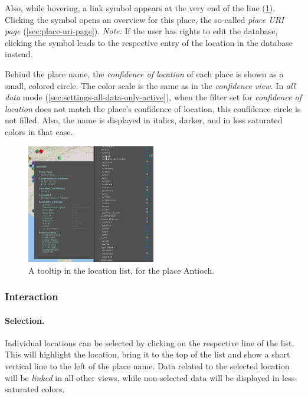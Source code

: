 Also, while hovering, a link symbol appears at the very end of the line (\cref{fig:location-list-2}).
Clicking the symbol opens an overview for this place, the so-called \emph{place URI page} (\cref{sec:place-uri-page}).
\emph{Note:} If the user has rights to edit the database, clicking the symbol leads to the respective entry of the location in the database instead.

Behind the place name, the \emph{confidence of location} of each place is shown as a small, colored circle.
The color scale is the same as in the \emph{confidence view.}
In \emph{all data} mode (\cref{sec:settings-all-data-only-active}), when the filter set for \emph{confidence of location} does not match the place’s confidence of location, this confidence circle is not filled.
Also, the name is displayed in italics, darker, and in less saturated colors in that case.

\begin{figure}[tb]
  \centering
  \includegraphics[width=0.5\textwidth]{../src/assets/visualization-documentation/location-list-2.png}
  \caption{
    A tooltip in the location list, for the place Antioch.
  }
  \label{fig:location-list-2}
\end{figure}


\subsubsection{Interaction}
\label{sec:location-list-interaction}

\paragraph{Selection.}
Individual locations can be selected by clicking on the respective line of the list.
This will highlight the location, bring it to the top of the list and show a short vertical line to the left of the place name.
Data related to the selected location will be \emph{linked} in all other views, while non-selected data will be displayed in less-saturated colors.

